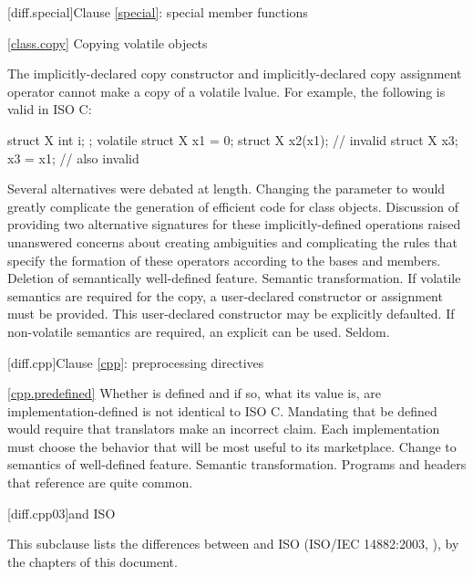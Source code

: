 [diff.special]{Clause \ref{special}: special member functions}

\ref{class.copy}
\change Copying volatile objects

The implicitly-declared copy constructor and
implicitly-declared copy assignment operator
cannot make a copy of a volatile lvalue.
For example, the following is valid in ISO C:

\begin{codeblock}
struct X { int i; };
volatile struct X x1 = {0};
struct X x2(x1);                // invalid \Cpp
struct X x3;
x3 = x1;                        // also invalid \Cpp
\end{codeblock}

\rationale
Several alternatives were debated at length.
Changing the parameter to
would greatly complicate the generation of
efficient code for class objects.
Discussion of
providing two alternative signatures for these
implicitly-defined operations raised
unanswered concerns about creating
ambiguities and complicating
the rules that specify the formation of
these operators according to the bases and
members.
\effect
Deletion of semantically well-defined feature.
\difficulty
Semantic transformation.
If volatile semantics are required for the copy,
a user-declared constructor or assignment must
be provided. \enternote This user-declared
constructor may be explicitly defaulted. \exitnote
If non-volatile semantics are required,
an explicit
can be used.
\howwide
Seldom.

[diff.cpp]{Clause \ref{cpp}: preprocessing directives}

\ref{cpp.predefined}
\change Whether  is defined and if so, what its value is, are
implementation-defined
\rationale
\Cpp is not identical to ISO C.
Mandating that 
be defined would require that translators make an incorrect claim.
Each implementation must choose the behavior that will be most
useful to its marketplace.
\effect
Change to semantics of well-defined feature.
\difficulty
Semantic transformation.
\howwide
Programs and headers that reference  are
quite common.

[diff.cpp03]{\Cpp and ISO \CppIII}

\pnum
{}%
This subclause lists the differences between \Cpp and
ISO \CppIII (ISO/IEC 14882:2003, ),
by the chapters of this document.

